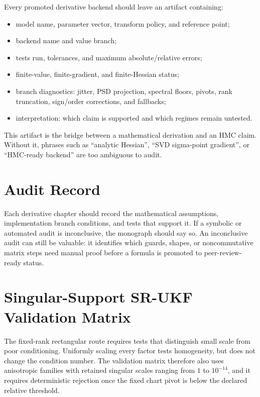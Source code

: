 Every promoted derivative backend should leave an artifact containing:
\begin{itemize}
  \item model name, parameter vector, transform policy, and reference point;
  \item backend name and value branch;
  \item tests run, tolerances, and maximum absolute/relative errors;
  \item finite-value, finite-gradient, and finite-Hessian status;
  \item branch diagnostics: jitter, PSD projection, spectral floors, pivots,
    rank truncation, sign/order corrections, and fallbacks;
  \item interpretation: which claim is supported and which regimes remain
    untested.
\end{itemize}
This artifact is the bridge between a mathematical derivation and an HMC claim.
Without it, phrases such as ``analytic Hessian'', ``SVD sigma-point gradient'',
or ``HMC-ready backend'' are too ambiguous to audit.

\section{Audit Record}
\label{sec:bf-derivative-audit-record}

Each derivative chapter should record the mathematical assumptions,
implementation branch conditions, and tests that support it.  If a symbolic or
automated audit is inconclusive, the monograph should say so.  An inconclusive
audit can still be valuable: it identifies which guards, shapes, or
noncommutative matrix steps need manual proof before a formula is promoted to
peer-review-ready status.

\section{Singular-Support SR-UKF Validation Matrix}
\label{sec:bf-singular-srukf-validation}

The fixed-rank rectangular route requires tests that distinguish small scale
from poor conditioning.  Uniformly scaling every factor tests homogeneity, but
does not change the condition number.  The validation matrix therefore also
uses anisotropic families with retained singular scales ranging from
\(1\) to \(10^{-14}\), and it requires deterministic rejection once the fixed
chart pivot is below the declared relative threshold.

